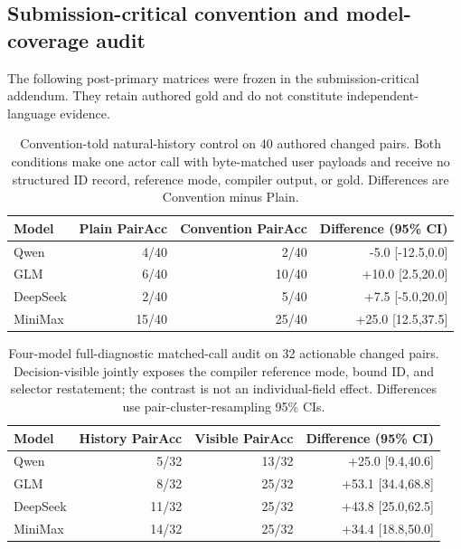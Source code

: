 \subsection{Submission-critical convention and model-coverage audit}
The following post-primary matrices were frozen in the submission-critical addendum. They retain authored gold and do not constitute independent-language evidence.

\begin{table}[H]
\centering
\small
\begin{tabular}{lrrr}
\toprule
Model & Plain PairAcc & Convention PairAcc & Difference (95\% CI) \\
\midrule
Qwen & 4/40 & 2/40 & -5.0 [-12.5,0.0] \\
GLM & 6/40 & 10/40 & +10.0 [2.5,20.0] \\
DeepSeek & 2/40 & 5/40 & +7.5 [-5.0,20.0] \\
MiniMax & 15/40 & 25/40 & +25.0 [12.5,37.5] \\
\bottomrule
\end{tabular}
\caption{Convention-told natural-history control on 40 authored changed pairs. Both conditions make one actor call with byte-matched user payloads and receive no structured ID record, reference mode, compiler output, or gold. Differences are Convention minus Plain.}
\label{tab:supp-convention-told}
\end{table}

\begin{table}[H]
\centering
\small
\begin{tabular}{lrrr}
\toprule
Model & History PairAcc & Visible PairAcc & Difference (95\% CI) \\
\midrule
Qwen & 5/32 & 13/32 & +25.0 [9.4,40.6] \\
GLM & 8/32 & 25/32 & +53.1 [34.4,68.8] \\
DeepSeek & 11/32 & 25/32 & +43.8 [25.0,62.5] \\
MiniMax & 14/32 & 25/32 & +34.4 [18.8,50.0] \\
\bottomrule
\end{tabular}
\caption{Four-model full-diagnostic matched-call audit on 32 actionable changed pairs. Decision-visible jointly exposes the compiler reference mode, bound ID, and selector restatement; the contrast is not an individual-field effect. Differences use pair-cluster-resampling 95\% CIs.}
\label{tab:supp-four-model-matched}
\end{table}

